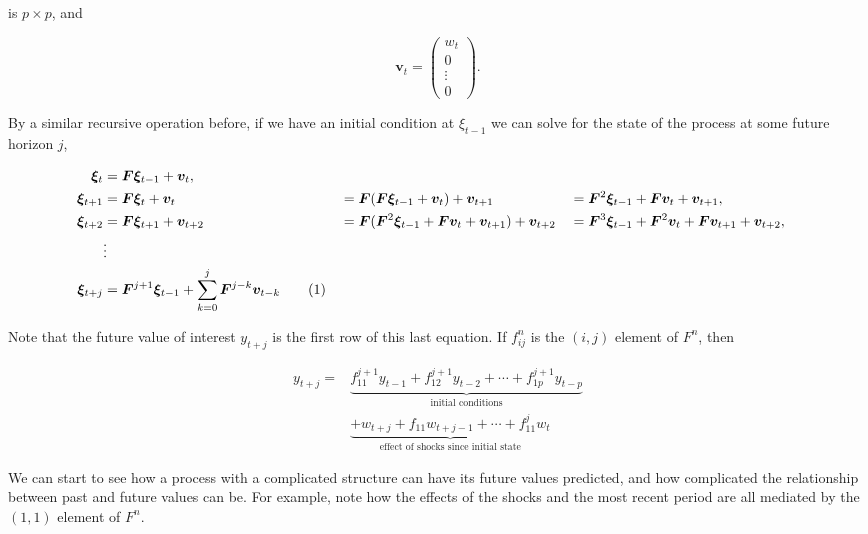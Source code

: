 \documentclass{tufte-book}
\begin{document}
\noindent is $p \times p$, and

\[
\bm{v}_t = \begin{pmatrix}
w_t \\
0 \\
\vdots \\
0
\end{pmatrix}.
\]

By a similar recursive operation before, if we have an initial condition at $\xi_{t-1}$ we can solve for the state of the process at some future horizon $j$,

\begin{align*}
\bm{\xi}_t &= \bm{F} \bm{\xi}_{t-1} + \bm{v}_t, \\
\bm{\xi}_{t+1} &= \bm{F} \bm{\xi}_{t} + \bm{v}_t &&= \bm{F} (\bm{F} \bm{\xi}_{t-1} + \bm{v}_t) + \bm{v}_{t+1} && = \bm{F}^2 \bm{\xi}_{t-1} + \bm{F} \bm{v}_t + \bm{v}_{t+1}, \\
\bm{\xi}_{t+2} &= \bm{F} \bm{\xi}_{t+1} + \bm{v}_{t+2} &&= \bm{F} (\bm{F}^2 \bm{\xi}_{t-1} + \bm{F} \bm{v}_t + \bm{v}_{t+1}) + \bm{v}_{t+2} && = \bm{F}^3 \bm{\xi}_{t-1} + \bm{F}^2 \bm{v}_t + \bm{F} \bm{v}_{t+1} + \bm{v}_{t+2}, \\
&\vdots \\
\bm{\xi}_{t+j} &= \bm{F}^{j+1} \bm{\xi}_{t-1} + \sum_{k=0}^j \bm{F}^{j-k} \bm{v}_{t-k} \refstepcounter{equation} \tag{\theequation} \label{eq:p-order-j-horizon}
\end{align*}

Note that the future value of interest $y_{t+j}$ is the first row of this last equation. If $f_{ij}^{n}$ is the $(i,j)$ element of $F^n$, then

\begin{align*}
y_{t+j} = &\underbrace{f_{11}^{j+1} y_{t-1} + f_{12}^{j+1} y_{t-2} + \cdots + f_{1p}^{j+1} y_{t-p}}_{\text{initial conditions}}  \\ 
& \underbrace{+ w_{t+j} + f_{11} w_{t+j-1} + \cdots + f_{11}^j w_t}_{\text{effect of shocks since initial state}}
\end{align*}

We can start to see how a process with a complicated structure can have its future values predicted, and how complicated the relationship between past and future values can be. For example, note how the effects of the shocks and the most recent period are all mediated by the $(1,1)$ element of $F^n$. 
\end{document}
